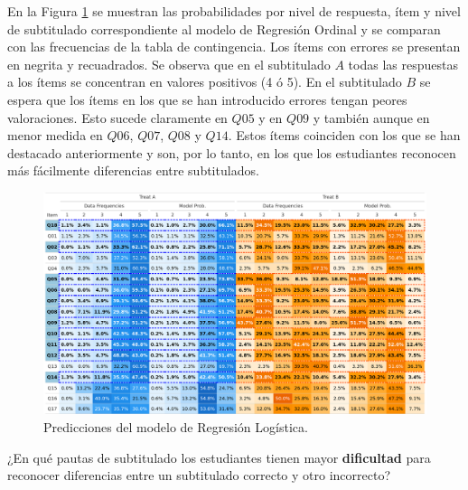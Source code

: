 \documentclass[
  12pt,
  a4paper,
  extrafontsizes,
  onecolumn,
  openright,
  table]{memoir}
\begin{document}
En la Figura \ref{fig-prob-compare} se muestran las probabilidades por
nivel de respuesta, ítem y nivel de subtitulado correspondiente al
modelo de Regresión Ordinal y se comparan con las frecuencias de la
tabla de contingencia. Los ítems con errores se presentan en negrita y
recuadrados. Se observa que en el subtitulado \(A\) todas las respuestas
a los ítems se concentran en valores positivos (4 ó 5). En el
subtitulado \(B\) se espera que los ítems en los que se han introducido
errores tengan peores valoraciones. Esto sucede claramente en \(Q05\) y
en \(Q09\) y también aunque en menor medida en \(Q06\), \(Q07\), \(Q08\)
y \(Q14\). Estos ítems coinciden con los que se han destacado
anteriormente y son, por lo tanto, en los que los estudiantes reconocen
más fácilmente diferencias entre subtitulados.

\begin{figure}[h]
\begin{adjustwidth}{-3.4cm}{}

\includegraphics[width=1.2\linewidth]{images/bayes-probs.png} \hfill{}

\caption{\label{fig-prob-compare}Predicciones del modelo de Regresión Logística.}

\end{adjustwidth}
\end{figure}

\begin{tcolorbox}[enhanced jigsaw, arc=.35mm, bottomtitle=1mm, left=2mm, toptitle=1mm, breakable, opacitybacktitle=0.6, rightrule=.15mm, toprule=.15mm, colbacktitle=quarto-callout-tip-color!10!white, leftrule=.75mm, colframe=quarto-callout-tip-color-frame, colback=white, titlerule=0mm, opacityback=0, bottomrule=.15mm, coltitle=black, title=\textcolor{quarto-callout-tip-color}{\faLightbulb}\hspace{0.5em}{Objetivo específico}]

¿En qué pautas de subtitulado los estudiantes tienen mayor
\textbf{dificultad} para reconocer diferencias entre un subtitulado
correcto y otro incorrecto?

\end{tcolorbox}
\end{document}
